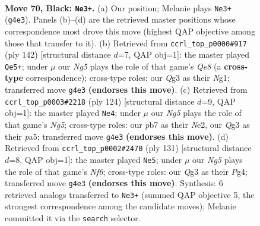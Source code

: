 \documentclass[11pt]{article}
\begin{document}
\clearpage

\begin{figure}[p]\centering
\begin{subfigure}{0.46\textwidth}\centering
\resizebox{\linewidth}{!}{%
\newchessgame
\chessboard[
  setfen={3k4/1P6/6K1/8/6n1/6q1/3N4/8 b - - 0 70},
  showmover=false,
  pgfstyle=straightmove, color=movearrow, markmove={g4-e3}
]}
\caption{}
\end{subfigure}\hfill
\begin{subfigure}{0.46\textwidth}\centering
\resizebox{\linewidth}{!}{%
\newchessgame
\chessboard[
  setfen={4Q3/8/8/2k5/8/4K1p1/8/6N1 w - - 0 72},
  showmover=false,
  pgfstyle=straightmove, color=movearrow, markmove={e8-e5}
]}
\caption{}
\end{subfigure}
\\[4pt]
\begin{subfigure}{0.46\textwidth}\centering
\resizebox{\linewidth}{!}{%
\newchessgame
\chessboard[
  setfen={8/1p2k3/8/p5N1/8/8/4NK2/8 w - - 0 63},
  showmover=false,
  pgfstyle=straightmove, color=movearrow, markmove={g5-e4}
]}
\caption{}
\end{subfigure}\hfill
\begin{subfigure}{0.46\textwidth}\centering
\resizebox{\linewidth}{!}{%
\newchessgame
\chessboard[
  setfen={8/4K3/1k6/8/1P4p1/5n2/6N1/8 b - - 3 66},
  showmover=false,
  pgfstyle=straightmove, color=movearrow, markmove={f3-e5}
]}
\caption{}
\end{subfigure}
\caption{\textbf{Move 70, Black: \texttt{Ne3+}.} (a) Our position; Melanie plays \texttt{Ne3+} (\texttt{g4e3}). Panels (b)--(d) are the retrieved master positions whose correspondence most drove this move (highest QAP objective among those that transfer to it). (b) Retrieved from \texttt{ccrl\_top\_p0000\#917} (ply 142) [structural distance $d$=7, QAP obj=1]: the master played \texttt{Qe5+}; under $\mu$ our \emph{Ng5} plays the role of that game's \emph{Qe8} (a \textbf{cross-type} correspondence); cross-type roles: our \emph{Q}g3 as their \emph{N}g1; transferred move \texttt{g4e3} \textbf{(endorses this move)}. (c) Retrieved from \texttt{ccrl\_top\_p0003\#2218} (ply 124) [structural distance $d$=9, QAP obj=1]: the master played \texttt{Ne4}; under $\mu$ our \emph{Ng5} plays the role of that game's \emph{Ng5}; cross-type roles: our \emph{p}b7 as their \emph{N}e2, our \emph{Q}g3 as their \emph{p}a5; transferred move \texttt{g4e3} \textbf{(endorses this move)}. (d) Retrieved from \texttt{ccrl\_top\_p0002\#2470} (ply 131) [structural distance $d$=8, QAP obj=1]: the master played \texttt{Ne5}; under $\mu$ our \emph{Ng5} plays the role of that game's \emph{Nf6}; cross-type roles: our \emph{Q}g3 as their \emph{P}g4; transferred move \texttt{g4e3} \textbf{(endorses this move)}. Synthesis: 6 retrieved analogs transferred to \texttt{Ne3+} (summed QAP objective 5, the strongest correspondence among the candidate moves); Melanie committed it via the \texttt{search} selector.}
\label{fig:thought-m139}
\end{figure}
\end{document}
